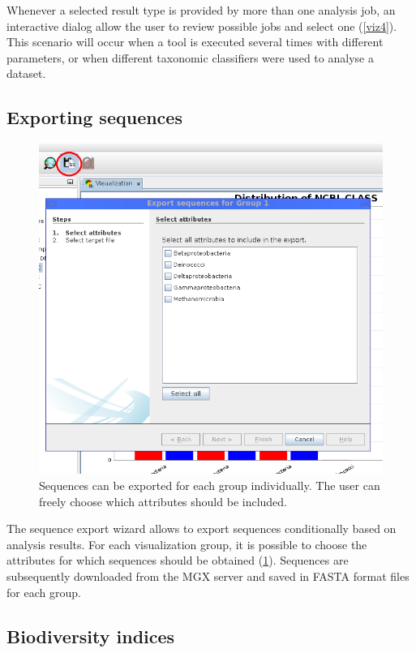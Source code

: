Whenever a selected result type is provided by more than one analysis job, an interactive dialog allow the user to
review possible jobs and select one (\ref{viz4}). This scenario will occur when a tool is executed several 
times with different parameters, or when different taxonomic classifiers were used to analyse a dataset.

\subsection{Exporting sequences}

\begin{figure}[H]
\centering
\includegraphics[width=.8\textwidth]{img/mgx/SeqExport}
\caption[Exporting sequences]{Sequences can be exported for each group individually. The user can freely choose
which attributes should be included.}
\label{seqexp}
\end{figure}

The sequence export wizard allows to export sequences conditionally based on analysis results. For each
visualization group, it is possible to choose the attributes for which sequences should be obtained (\ref{seqexp}).
Sequences are subsequently downloaded from the MGX server and saved in FASTA format files for each group.


\subsection{Biodiversity indices}

